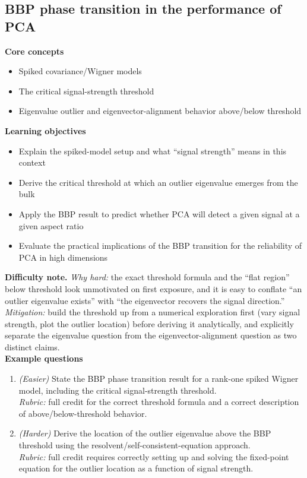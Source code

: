 \documentclass[11pt]{article}
\begin{document}
\subsection{BBP phase transition in the performance of PCA}
\textbf{Core concepts}
\begin{itemize}[nosep]
\item Spiked covariance/Wigner models
\item The critical signal-strength threshold
\item Eigenvalue outlier and eigenvector-alignment behavior above/below threshold
\end{itemize}
\textbf{Learning objectives}
\begin{itemize}[nosep]
\item Explain the spiked-model setup and what ``signal strength'' means in this context
\item Derive the critical threshold at which an outlier eigenvalue emerges from the bulk
\item Apply the BBP result to predict whether PCA will detect a given signal at a given aspect ratio
\item Evaluate the practical implications of the BBP transition for the reliability of PCA in high dimensions
\end{itemize}
\textbf{Difficulty note.} \emph{Why hard:} the exact threshold formula and the ``flat region'' below threshold look unmotivated on first exposure, and it is easy to conflate ``an outlier eigenvalue exists'' with ``the eigenvector recovers the signal direction.'' \emph{Mitigation:} build the threshold up from a numerical exploration first (vary signal strength, plot the outlier location) before deriving it analytically, and explicitly separate the eigenvalue question from the eigenvector-alignment question as two distinct claims.\\[4pt]
\textbf{Example questions}
\begin{enumerate}[nosep]
\item \emph{(Easier)} State the BBP phase transition result for a rank-one spiked Wigner model, including the critical signal-strength threshold. \\
\emph{Rubric:} full credit for the correct threshold formula and a correct description of above/below-threshold behavior.
\item \emph{(Harder)} Derive the location of the outlier eigenvalue above the BBP threshold using the resolvent/self-consistent-equation approach. \\
\emph{Rubric:} full credit requires correctly setting up and solving the fixed-point equation for the outlier location as a function of signal strength.
\end{enumerate}
\end{document}
